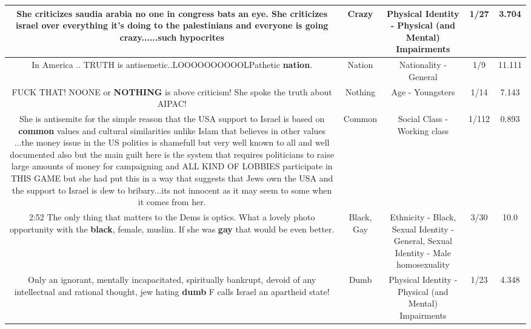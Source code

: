 \documentclass[11pt]{article}
\newlength\mylength
\begin{document}
\begin{center}
\begin{longtable}{|C{.65\mylength}|C{.30\mylength}|C{.12\mylength}|C{.12\mylength}|C{.12\mylength}|}
  \small She criticizes saudia arabia no one in congress bats an eye. She criticizes israel over everything it's doing to the palestinians and everyone is going \textbf{crazy}......such hypocrites\normalsize   & Crazy & Physical Identity - Physical (and Mental) Impairments & 1/27 & 3.704 \\  \hline
  \small In America .. TRUTH is antisemetic..LOOOOOOOOOOLPathetic \textbf{nation}.\normalsize   & Nation & Nationality - General & 1/9 & 11.111 \\  \hline
  \small FUCK THAT! NOONE or \textbf{NOTHING} is above criticism! She spoke the truth about AIPAC!\normalsize   & Nothing & Age - Youngsters & 1/14 & 7.143 \\  \hline
  \small She is antisemite for the simple reason that the USA support to Israel is based on \textbf{common} values and cultural similarities unlike Islam that believes in other values ...the money issue in the US politics is shamefull but very well known to all and well documented also but the main guilt here is the system that requires politicians to raise large amounts of money for campaigning and ALL KIND OF LOBBIES participate in THIS GAME but she had put this in a way that suggests that Jews own the USA and the support to Israel is dew to bribary...its not innocent as it may seem to some when it comes from her.\normalsize   & Common & Social Class - Working class & 1/112 & 0.893 \\  \hline
  \small 2:52 The only thing that matters to the Dems is optics. What a lovely photo opportunity with the \textbf{black}, female, muslim. If she was \textbf{g\textbf{ay}} that would be even better.\normalsize   & Black, Gay & Ethnicity - Black, Sexual Identity - General, Sexual Identity - Male homosexuality & 3/30 & 10.0 \\  \hline
  \small Only an ignorant, mentally incapacitated, spiritually bankrupt, devoid of any intellectual and rational thought, jew hating \textbf{dumb} F calls Israel an apartheid state!\normalsize   & Dumb & Physical Identity - Physical (and Mental) Impairments & 1/23 & 4.348 \\  \hline

\end{longtable}
\end{center}
\end{document}
